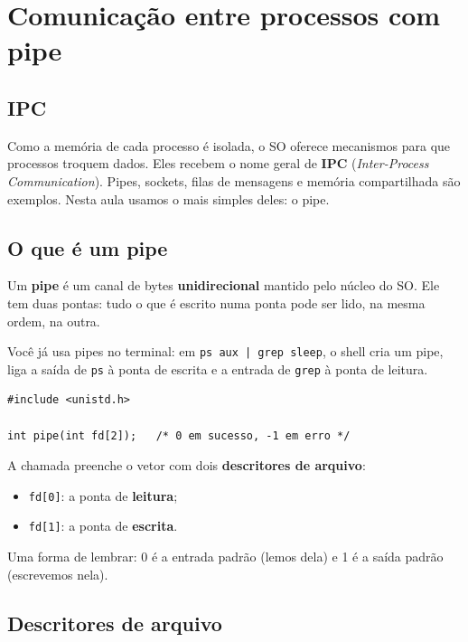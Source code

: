 \documentclass[11pt,a4paper]{article}
\newcommand{\cmd}[1]{\texttt{#1}}
\begin{document}
\section{Comunicação entre processos com pipe}\label{sec:pipe}

\subsection{IPC}

Como a memória de cada processo é isolada, o SO oferece mecanismos para que processos troquem dados. Eles recebem o nome geral de \textbf{IPC} (\emph{Inter-Process Communication}). Pipes, sockets, filas de mensagens e memória compartilhada são exemplos. Nesta aula usamos o mais simples deles: o pipe.

\subsection{O que é um pipe}

\begin{definicao}
Um \textbf{pipe} é um canal de bytes \textbf{unidirecional} mantido pelo núcleo do SO. Ele tem duas pontas: tudo o que é escrito numa ponta pode ser lido, na mesma ordem, na outra.
\end{definicao}

Você já usa pipes no terminal: em \cmd{ps aux | grep sleep}, o shell cria um pipe, liga a saída de \cmd{ps} à ponta de escrita e a entrada de \cmd{grep} à ponta de leitura.

\begin{lstlisting}[style=codigo]
#include <unistd.h>

int pipe(int fd[2]);   /* 0 em sucesso, -1 em erro */
\end{lstlisting}

A chamada preenche o vetor com dois \textbf{descritores de arquivo}:

\begin{itemize}
    \item \cmd{fd[0]}: a ponta de \textbf{leitura};
    \item \cmd{fd[1]}: a ponta de \textbf{escrita}.
\end{itemize}

Uma forma de lembrar: 0 é a entrada padrão (lemos dela) e 1 é a saída padrão (escrevemos nela).

\subsection{Descritores de arquivo}
\end{document}
